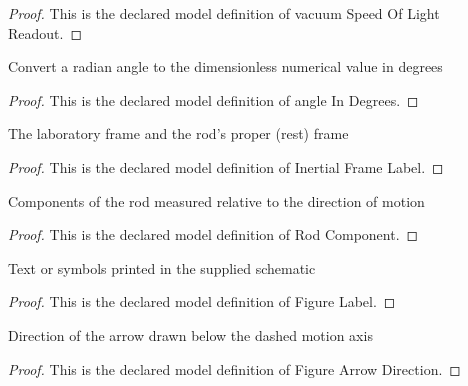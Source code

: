 \begin{proof}
  This is the declared model definition of vacuum Speed Of Light Readout.
\end{proof}
\begin{definition}
  \label{def:physics:phyx-mini-0526:phyxminiproblems-problemphyxmini0526-angleindegrees}
  Convert a radian angle to the dimensionless numerical value in degrees
\end{definition}
\begin{proof}
  This is the declared model definition of angle In Degrees.
\end{proof}
\begin{definition}
  \label{def:physics:phyx-mini-0526:phyxminiproblems-problemphyxmini0526-inertialframelabel}
  The laboratory frame and the rod's proper (rest) frame
\end{definition}
\begin{proof}
  This is the declared model definition of Inertial Frame Label.
\end{proof}
\begin{definition}
  \label{def:physics:phyx-mini-0526:phyxminiproblems-problemphyxmini0526-rodcomponent}
  Components of the rod measured relative to the direction of motion
\end{definition}
\begin{proof}
  This is the declared model definition of Rod Component.
\end{proof}
\begin{definition}
  \label{def:physics:phyx-mini-0526:phyxminiproblems-problemphyxmini0526-figurelabel}
  Text or symbols printed in the supplied schematic
\end{definition}
\begin{proof}
  This is the declared model definition of Figure Label.
\end{proof}
\begin{definition}
  \label{def:physics:phyx-mini-0526:phyxminiproblems-problemphyxmini0526-figurearrowdirection}
  Direction of the arrow drawn below the dashed motion axis
\end{definition}
\begin{proof}
  This is the declared model definition of Figure Arrow Direction.
\end{proof}
